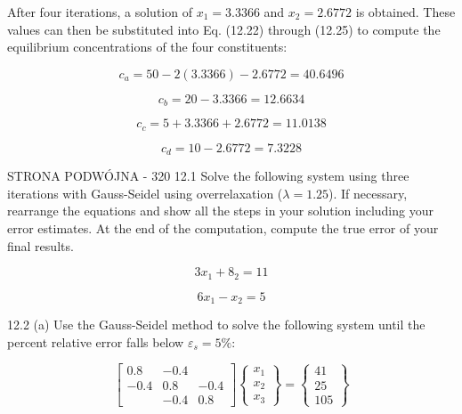 \documentclass[../main.tex]{subfiles}
\begin{document}
After four iterations, a solution of $x_{1}=3.3366$ and $x_{2}=2.6772$ is obtained. These values
can then be substituted into Eq. (12.22) through (12.25) to compute the equilibrium concentrations of the four constituents:

\begin{equation}
c_{a}=50-2(3.3366)-2.6772=40.6496
\end{equation}

\begin{equation}
c_{b}=20-3.3366=12.6634
\end{equation}

\begin{equation}
c_{c}=5+3.3366+2.6772=11.0138
\end{equation}

\begin{equation}
c_{d}=10-2.6772=7.3228
\end{equation}



STRONA PODWÓJNA - 320
12.1 Solve the following system using three iterations with
Gauss-Seidel using overrelaxation ($\lambda =1.25$). If necessary,
rearrange the equations and show all the steps in your solution including your error estimates. At the end of the computation, compute the true error of your final results.

\begin{equation}
3x_{1}+8_{2}=11
\end{equation}

\begin{equation}
6x_{1}-x_{2}=5
\end{equation}

12.2 (a) Use the Gauss-Seidel method to solve the following
system until the percent relative error falls below $\varepsilon_{s}=5\%$:

\begin{equation}
\begin{bmatrix}
0.8 & -0.4 & \\
-0.4 & 0.8 & -0.4\\
 & -0.4 & 0.8
\end{bmatrix} \begin{Bmatrix}
x_{1}\\
x_{2}\\
x_{3}
\end{Bmatrix}=\begin{Bmatrix}
41\\
25\\
105
\end{Bmatrix}
\end{equation}
\end{document}
